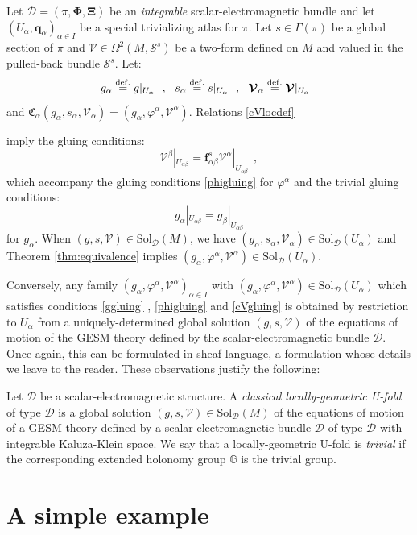 \documentclass[10pt, cmp, numbook, final, a4paper]{svjour}
\newcommand*{\SavedEqref}{}
\let\SavedEqref\eqref
\renewcommand*{\eqref}[1]{%
  \begingroup
    \hypersetup{
      linkcolor=blue,
      linkbordercolor=blue,
    }%
    \SavedEqref{#1}%
  \endgroup
}
\newcommand{\eqdef}{\stackrel{{\rm def.}}{=}}
\def\bcD{\boldsymbol{\mathcal{D}}}
\newcommand{\be}{\begin{equation*}}
\newcommand{\ee}{\end{equation*}}
\newcommand{\ben}{\begin{equation}}
\newcommand{\een}{\end{equation}}
\def\cD{\mathcal{D}}
\def\bXi{{\boldsymbol{\Xi}}}
\def\cV{\mathcal{V}}
\def\mf{\mathbf{f}}
\def\bPhi{\mathbf{\Phi}}
\def\Sol{\mathrm{Sol}}
\def\bcS{\boldsymbol{\mathcal{S}}}
\def\mq{\mathbf{q}}
\def\bcV{\boldsymbol{\cV}}
\begin{document}
Let $\bcD=(\pi, \bPhi, \bXi)$ be an {\em integrable}
scalar-electromagnetic bundle and let
$(U_\alpha,\mq_\alpha)_{\alpha\in I}$ be a special trivializing atlas
for $\pi$. Let $s\in \Gamma(\pi)$ be a global section of $\pi$ and
$\cV\in\Omega^2(M,\bcS^s)$ be a two-form defined on $M$ and valued in
the pulled-back bundle $\bcS^s$. Let:
\be
g_\alpha\eqdef g|_{U_\alpha}~~,~~s_\alpha\eqdef s|_{U_\alpha}~~,~~\bcV_\alpha\eqdef \bcV|_{U_\alpha}~~
\ee
and $\mathfrak{C}_{\alpha}(g_{\alpha},s_{\alpha},\bcV_{\alpha})=
(g_{\alpha},\varphi^\alpha,\cV^\alpha)$.  Relations \eqref{cVlocdef}
imply the gluing conditions:
\ben
\label{cVgluing}
\cV^{\beta}|_{U_{\alpha\beta}}=\mf_{\alpha\beta}^s \cV^{\alpha}|_{U_{\alpha\beta}}~~,
\een
which accompany the gluing conditions \eqref{phigluing} for $\varphi^{\alpha}$ 
and the trivial gluing conditions:
\ben
\label{ggluing}
g_\alpha|_{U_{\alpha\beta}}=g_\beta|_{U_{\alpha\beta}}
\een
for $g_\alpha$. When $(g,s,\bcV)\in \Sol_{\bcD}(M)$, we have
$(g_\alpha,s_\alpha,\bcV_\alpha)\in \Sol_{\bcD}(U_\alpha)$ and Theorem
\ref{thm:equivalence} implies
$(g_{\alpha},\varphi^\alpha,\cV^\alpha)\in \Sol_{\cD}(U_\alpha)$.

Conversely, any family $(g_\alpha, \varphi^\alpha,
\cV^{\alpha})_{\alpha\in I}$ with $(g_\alpha, \varphi^\alpha,
\cV^{\alpha})\in \Sol_\cD(U_\alpha)$ which satisfies conditions
\eqref{ggluing}, \eqref{phigluing} and \eqref{cVgluing} is obtained by
restriction to $U_\alpha$ from a uniquely-determined global solution
$(g, s,\bcV)$ of the equations of motion of the GESM theory defined by
the scalar-electromagnetic bundle $\bcD$. Once again, this can be
formulated in sheaf language, a formulation whose details we leave to
the reader. These observations justify the following:
		
\begin{definition}
Let $\cD$ be a scalar-electromagnetic structure. A {\em classical
  locally-geometric U-fold} of type $\cD$ is a global solution
$(g,s,\bcV)\in \Sol_{\bcD}(M)$ of the equations of motion of a GESM
theory defined by a scalar-electromagnetic bundle $\bcD$ of type $\cD$
with integrable Kaluza-Klein space. We say that a locally-geometric
U-fold is {\em trivial} if the corresponding extended holonomy
group $\mathbb{G}$ is the trivial group.
\end{definition}

\section{A simple example}
\label{sec:SS}
\end{document}
